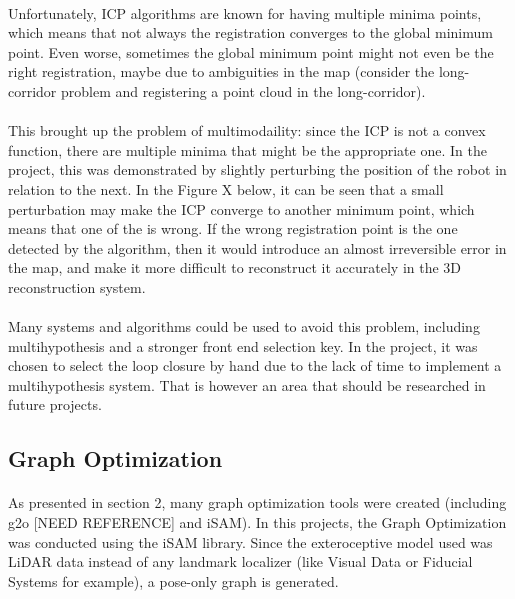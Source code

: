 \documentclass[12pt]{article}
\begin{document}
	\paragraph{}
	Unfortunately, ICP algorithms are known for having multiple minima points, which means that not always the registration converges to the global minimum point. Even worse, sometimes the global minimum point might not even be the right registration, maybe due to ambiguities in the map (consider the long-corridor problem and registering a point cloud in the long-corridor).
	
	\paragraph{}
	This brought up the problem of multimodaility: since the ICP is not a convex function, there are multiple minima that might be the appropriate one. In the project, this was demonstrated by slightly perturbing the position of the robot in relation to the next. In the Figure X below, it can be seen that a small perturbation may make the ICP converge to another minimum point, which means that one of the is wrong. If the wrong registration point is the one detected by the algorithm, then it would introduce an almost irreversible error in the map, and make it more difficult to reconstruct it accurately in the 3D reconstruction system.
	
	\paragraph{}
	Many systems and algorithms could be used to avoid this problem, including multihypothesis and a stronger front end selection key. In the project, it was chosen to select the loop closure by hand due to the lack of time to implement a multihypothesis system. That is however an area that should be researched in future projects.
	\subsection{Graph Optimization}
	\label{subs:GraphOpt}
	\paragraph{}
	As presented in section 2, many graph optimization tools were created (including g2o [NEED REFERENCE] and iSAM). In this projects, the Graph Optimization was conducted using the iSAM library. Since the exteroceptive model used was LiDAR data instead of any landmark localizer (like Visual Data or Fiducial Systems for example), a pose-only graph is generated.
\end{document}
